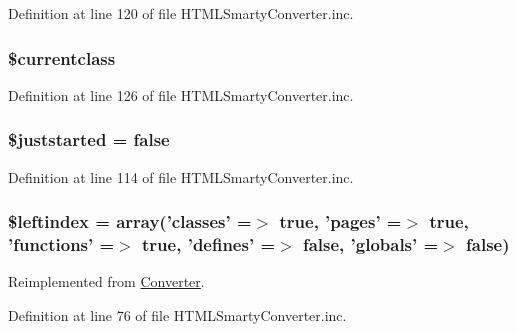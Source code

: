 \-Definition at line 120 of file \-H\-T\-M\-L\-Smarty\-Converter.\-inc.

\hypertarget{class_h_t_m_l_smarty_converter_a14f3ccc5fc24cdb94ee022a77ef69c4d}{
\subsubsection[{\$currentclass}]{\setlength{\rightskip}{0pt plus 5cm}\$currentclass}}\label{class_h_t_m_l_smarty_converter_a14f3ccc5fc24cdb94ee022a77ef69c4d}


\-Definition at line 126 of file \-H\-T\-M\-L\-Smarty\-Converter.\-inc.

\hypertarget{class_h_t_m_l_smarty_converter_acb00e2d25525278b0592bfffe53bc4b6}{
\subsubsection[{\$juststarted}]{\setlength{\rightskip}{0pt plus 5cm}\$juststarted = false}}\label{class_h_t_m_l_smarty_converter_acb00e2d25525278b0592bfffe53bc4b6}


\-Definition at line 114 of file \-H\-T\-M\-L\-Smarty\-Converter.\-inc.

\hypertarget{class_h_t_m_l_smarty_converter_ab49669c749559bb7833762878adb8f0c}{
\subsubsection[{\$leftindex}]{\setlength{\rightskip}{0pt plus 5cm}\$leftindex = array('classes' =$>$ true, 'pages' =$>$ true, 'functions' =$>$ true, 'defines' =$>$ false, 'globals' =$>$ false)}}\label{class_h_t_m_l_smarty_converter_ab49669c749559bb7833762878adb8f0c}


\-Reimplemented from \hyperlink{class_converter_ab49669c749559bb7833762878adb8f0c}{\-Converter}.



\-Definition at line 76 of file \-H\-T\-M\-L\-Smarty\-Converter.\-inc.

